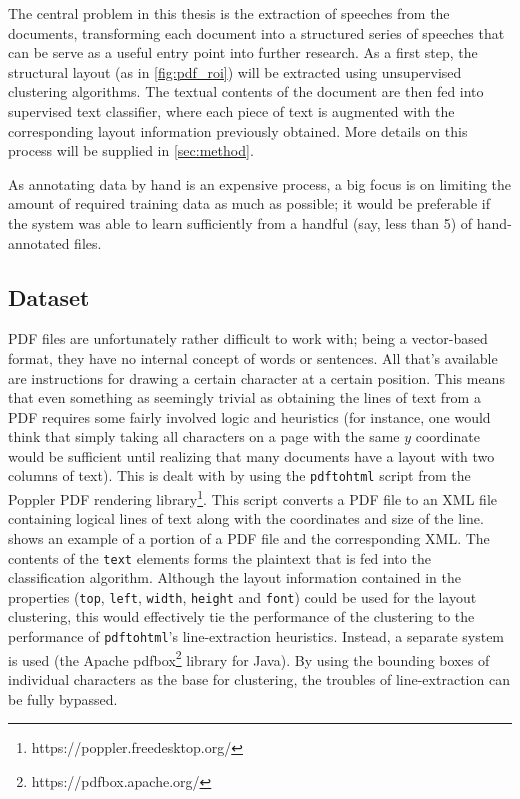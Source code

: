 The central problem in this thesis is the extraction of speeches from the
documents, transforming each document into a structured series of speeches that
can be serve as a useful entry point into further research. As a first step, the
structural layout (as in \cref{fig:pdf_roi}) will be extracted using
unsupervised clustering algorithms. The textual contents of the document are
then fed into supervised text classifier, where each piece of text is augmented
with the corresponding layout information previously obtained. More details on
this process will be supplied in \cref{sec:method}.

As annotating data by hand is an expensive process, a big focus is on limiting
the amount of required training data as much as possible; it would be preferable
if the system was able to learn sufficiently from a handful (say, less than 5)
of hand-annotated files.

\subsection{Dataset}
PDF files are unfortunately rather difficult to work with; being a vector-based
format, they have no internal concept of words or sentences. All that's
available are instructions for drawing a certain character at a certain
position. This means that even something as seemingly trivial as obtaining the
lines of text from a PDF requires some fairly involved logic and heuristics (for
instance, one would think that simply taking all characters on a page with the
same $y$ coordinate would be sufficient until realizing that many documents have
a layout with two columns of text). This is dealt with by using the
\texttt{pdftohtml} script from the Poppler PDF rendering
library\footnote{https://poppler.freedesktop.org/}. This script converts a PDF
file to an XML file containing logical lines of text along with the coordinates
and size of the line.  shows an example of a portion of
a PDF file and the corresponding XML\@. The contents of the \texttt{text} elements
forms the plaintext that is fed into the classification algorithm. Although the
layout information contained in the properties (\texttt{top}, \texttt{left},
\texttt{width}, \texttt{height} and \texttt{font}) could be used for the layout
clustering, this would effectively tie the performance of the clustering to the
performance of \texttt{pdftohtml}'s line-extraction heuristics. Instead, a
separate system is used (the Apache pdfbox\footnote{https://pdfbox.apache.org/}
library for Java). By using the bounding boxes of individual characters as the
base for clustering, the troubles of line-extraction can be fully bypassed.

